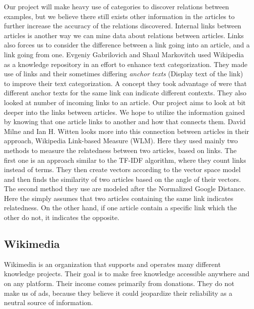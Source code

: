 Our project will make heavy use of categories to discover relations between examples, but we believe there still exists other information in the articles to further increase the accuracy of the relations discovered. Internal links between articles is another way we can mine data about relations between articles. Links also forces us to consider the difference between a link going into an article, and a link going from one. Evgeniy Gabrilovich and Shaul Markovitch used Wikipedia as a knowledge repository in an effort to enhance text categorization\cite{text-cat}. They made use of links and their sometimes differing \textit{anchor texts} (Display text of the link) to improve their text categorization. A concept they took advantage of were that different anchor texts for the same link can indicate different contexts.  They also looked at number of incoming links to an article. Our project aims to look at bit deeper into the links between articles. We hope to utilize the information gained by knowing that one article links to another and how that connects them. David Milne and Ian H. Witten looks more into this connection between articles in their approach,  Wikipedia Link-based Measure (WLM)\cite{wlm}. Here they used mainly two methods to measure the relatedness between two articles, based on links. The first one is an approach similar to the TF-IDF algorithm, where they count links instead of terms. They then create vectors according to the vector space model and then finds the similarity of two articles based on the angle of their vectors. The second method they use are modeled after the Normalized Google Distance\cite{gsd}. Here the simply assumes that two articles containing the same link indicates relatedness. On the other hand, if one article contain a specific link which the other do not, it indicates the opposite.



\subsection{Wikimedia} \label{wikimedia}
Wikimedia\cite{wikimedia} is an organization that supports and operates many different knowledge projects. Their goal is to make free knowledge accessible anywhere and on any platform. Their income comes primarily from donations. They do not make us of ads, because they believe it could jeopardize their reliability as a neutral source of information.

